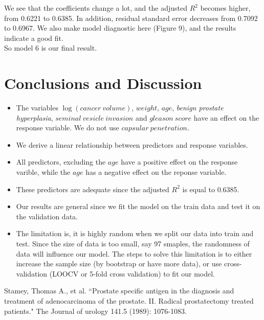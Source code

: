 \documentclass[12pt, letterpaper]{article}
\begin{document}
    We see that the coefficients change a lot, and the adjusted $R^2$ becomes higher, from 0.6221 to 0.6385. In addition, residual standard error decreases from 0.7092 to 0.6967. We also make model diagnostic here (Figure 9), and the results indicate a good fit.\\

    So model 6 is our final result.

\section{Conclusions and Discussion}

  \begin{itemize}

    \item The variables $\log(cancer~volume)$, $weight$, $age$, \textit{benign prostate hyperplasia}, $seminal~vesicle~invasion$ and $gleason~score$ have an effect on the response variable. We do not use $capsular~penetration$.
    \item We derive a linear relationship between predictors and response variables.
    \item All predictors, excluding the $age$ have a positive effect on the response varible, while the $age$ has a negative effect on the reponse variable.
    \item These predictors are adequate since the adjusted $R^2$ is equal to 0.6385.
    \item Our results are general since we fit the model on the train data and test it on the validation data.
    \item The limitation is, it is highly random when we split our data into train and test. Since the size of data is too small, say 97 smaples, the randomness of data will influence our model. The steps to solve this limitation is to either increase the sample size (by bootstrap or have more data), or use cross-validation (LOOCV or 5-fold cross validation) to fit our model.

  \end{itemize}

\begin{thebibliography}{0}
Stamey, Thomas A., et al. ``Prostate specific antigen in the diagnosis and treatment of adenocarcinoma of the prostate. II. Radical prostatectomy treated patients." The Journal of urology 141.5 (1989): 1076-1083.
\end{thebibliography}

\newpage



\newpage


\end{document}
